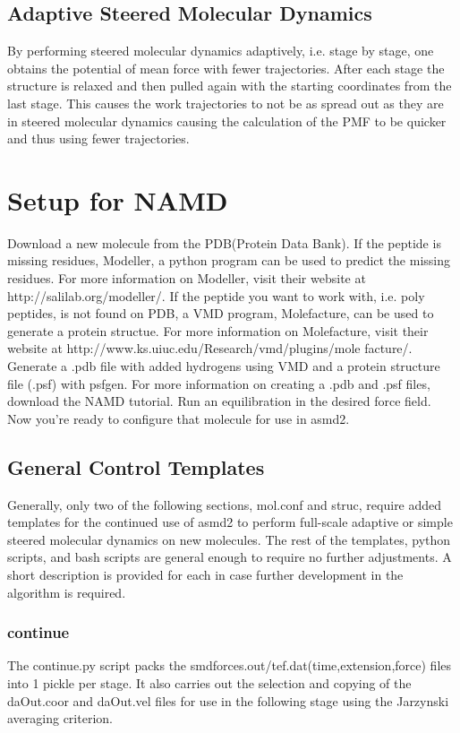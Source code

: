 \documentclass[11pt]{article}
\begin{document}
\subsection{Adaptive Steered Molecular Dynamics}
By performing steered molecular dynamics adaptively, i.e. stage by stage, one obtains the potential of mean force with fewer trajectories. After each stage the structure is relaxed and then pulled again with the starting coordinates from the last stage. This causes the work trajectories to not be as spread out as they are in steered molecular dynamics causing the calculation of the PMF to be quicker and thus using fewer trajectories. 



\section{Setup for NAMD}
Download a new molecule from the PDB(Protein Data Bank). If the peptide is missing residues, Modeller, a python program can be used to predict the missing residues. For more information on Modeller, visit their website at http://salilab.org/modeller/. If the peptide you want to work with, i.e. poly peptides, is not found on PDB, a VMD program, Molefacture, can be used to generate a protein structue. For more information on Molefacture, visit their website at http://www.ks.uiuc.edu/Research/vmd/plugins/mole
facture/. Generate a .pdb file with added hydrogens using VMD and a protein structure file (.psf) with psfgen. For more information on creating a .pdb and .psf files, download the NAMD tutorial. Run an equilibration in the desired force field.  
Now you're ready to configure that molecule for use in asmd2.
\subsection{General Control Templates}
Generally, only two of the following sections, mol.conf and struc, require added templates for the continued use of asmd2 to perform full-scale adaptive or simple steered molecular dynamics on new molecules. The rest of the templates, python scripts, and bash scripts are general enough to require no further adjustments. A short description is provided for each in case further development in the algorithm is required.
\subsubsection{continue}
The continue.py script packs the smdforces.out/tef.dat(time,extension,force) files into 1 pickle per stage. It also carries out the selection and copying of the daOut.coor and daOut.vel files for use in the following stage using the Jarzynski averaging criterion.
\end{document}
